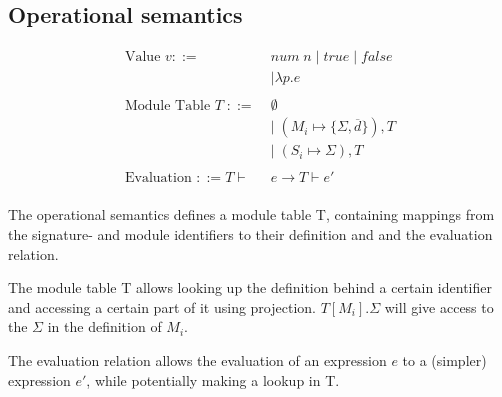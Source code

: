 \documentclass[10pt,a4paper,master=cws, masteroption=ai,english,inputenc=utf8]{kulemt}
\begin{document}

\subsection{Operational semantics}
\begin{align*}
\text{Value }v ::=\;&\mathit{num\;n} \; | \; \mathit{true} \; | \; \mathit{false} \\
&| \lambda p.e\\
\\
\text{Module Table } T\; ::= \;&\emptyset \\
&| \; (M_{i} \mapsto \lbrace \Sigma,\overline{d}\rbrace), T \\
&| \; (S_{i} \mapsto \Sigma), T\\
\\
\text{Evaluation } ::= T \vdash &e \rightarrow T \vdash e' \\
\end{align*}

The operational semantics defines a module table T, containing mappings from the signature-%
and module identifiers to their definition and and the evaluation relation. 

The module table T allows looking up the definition behind a certain identifier and accessing a certain part of it using projection. $T[M_{i}].\Sigma$ will give access to the $\Sigma$ in the definition of $M_{i}$. 

The evaluation relation allows the evaluation of an expression $e$ to a (simpler) expression $e'$, while potentially making a lookup in T.
\end{document}
